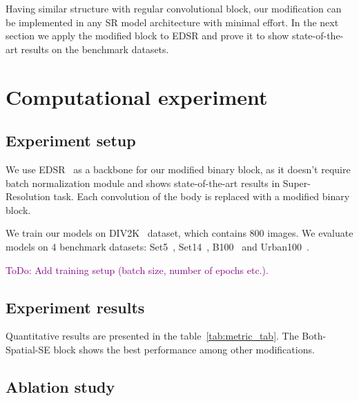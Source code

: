 \documentclass{article}
\newcommand{\TODO}[1]{\textcolor{purple}{ToDo: #1.}}
\begin{document}
Having similar structure with regular convolutional block, our modification can be implemented in any SR model architecture with minimal effort. In the next section we apply the modified block to EDSR and prove it to show state-of-the-art results on the benchmark datasets.

\section{Computational experiment}
\subsection{Experiment setup}

We use EDSR~\cite{lim2017enhanced} as a backbone for our modified binary block, as it doesn't require batch normalization module and shows state-of-the-art results in Super-Resolution task. Each convolution of the body is replaced with a modified binary block.

We train our models on DIV2K~\cite{agustsson2017ntire} dataset, which contains 800 images. We evaluate models on 4 benchmark datasets: Set5~\cite{bevilacqua2012low}, Set14~\cite{zeyde2012single}, B100~\cite{martin2001database} and Urban100~\cite{huang2015single}. 

\TODO{Add training setup (batch size, number of epochs etc.)}

\subsection{Experiment results}
Quantitative results are presented in the table~\ref{tab:metric_tab}. The Both-Spatial-SE block shows the best performance among other modifications.

\subsection{Ablation study}
\end{document}
